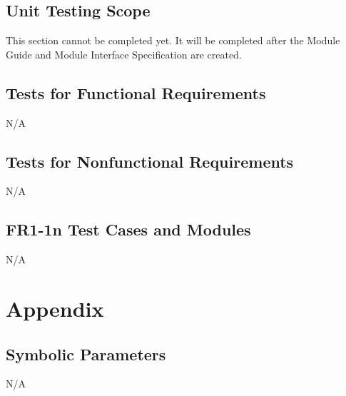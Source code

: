 \documentclass[12pt, titlepage]{article}
\begin{document}
\subsection{Unit Testing Scope}

This section cannot be completed yet. It will be completed after the Module Guide and Module Interface Specification are created.

\subsection{Tests for Functional Requirements}

N/A

\subsection{Tests for Nonfunctional Requirements}

N/A


\subsection{FR1-1n Test Cases and Modules}

N/A
				


% 


\newpage

\section{Appendix}

\subsection{Symbolic Parameters}

N/A
\end{document}
